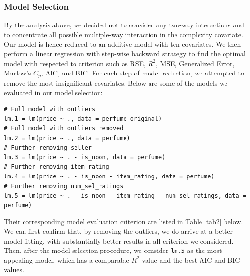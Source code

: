 \documentclass[12pt]{amsart}
\begin{document}
\subsubsection{Model Selection}

By the analysis above, we decided not to consider any two-way interactions and to concentrate all possible multiple-way interaction in the complexity covariate. Our model is hence reduced to an additive model with ten covariates. We then perform a linear regression with step-wise backward strategy to find the optimal model with respected to criterion such as RSE, $R^2$, MSE, Generalized Error, Marlow's $C_p$, AIC, and BIC. For each step of model reduction, we attempted to remove the most insignificant covariates. Below are some of the models we evaluated in our model selection:
\begin{lstlisting}
# Full model with outliers
lm.1 = lm(price ~ ., data = perfume_original)
# Full model with outliers removed
lm.2 = lm(price ~ ., data = perfume)
# Further removing seller
lm.3 = lm(price ~ . - is_noon, data = perfume) 
# Further removing item_rating
lm.4 = lm(price ~ . - is_noon - item_rating, data = perfume)
# Further removing num_sel_ratings
lm.5 = lm(price ~ . - is_noon - item_rating - num_sel_ratings, data = perfume)
\end{lstlisting}
Their corresponding model evaluation criterion are listed in Table \ref{tab2} below. We can first confirm that, by removing the outliers, we do arrive at a better model fitting, with substantially better results in all criterion we considered. Then, after the model selection procedure, we consider \texttt{lm.5} as the most appealing model, which has a comparable $R^2$ value and the best AIC and BIC values. 
\end{document}
